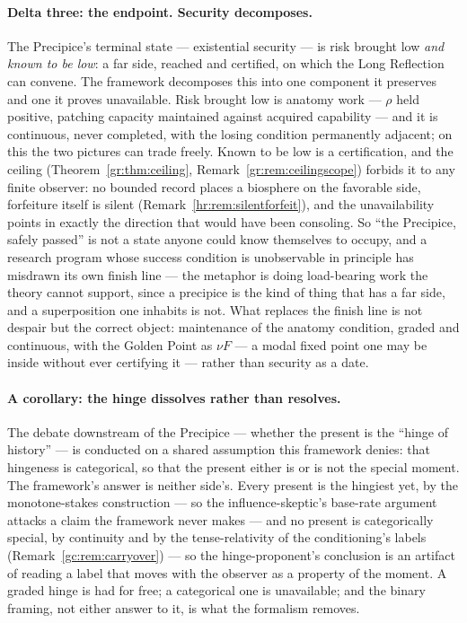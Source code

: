 \documentclass[11pt]{article}
\numberwithin{equation}{section}
\theoremstyle{plain}
\theoremstyle{definition}
\theoremstyle{remark}
\begin{document}
\paragraph{Delta three: the endpoint. Security decomposes.} The
Precipice's terminal state --- existential security --- is risk
brought low \emph{and known to be low}: a far side, reached and
certified, on which the Long Reflection can convene. The framework
decomposes this into one component it preserves and one it proves
unavailable. Risk brought low is anatomy work --- $\rho$ held
positive, patching capacity maintained against acquired capability ---
and it is continuous, never completed, with the losing condition
permanently adjacent; on this the two pictures can trade freely.
Known to be low is a certification, and the ceiling
(Theorem~\ref{gr:thm:ceiling}, Remark~\ref{gr:rem:ceilingscope})
forbids it to any finite observer: no bounded record places a
biosphere on the favorable side, forfeiture itself is silent
(Remark~\ref{hr:rem:silentforfeit}), and the unavailability points in
exactly the direction that would have been consoling. So ``the
Precipice, safely passed'' is not a state anyone could know themselves
to occupy, and a research program whose success condition is
unobservable in principle has misdrawn its own finish line --- the
metaphor is doing load-bearing work the theory cannot support, since a
precipice is the kind of thing that has a far side, and a
superposition one inhabits is not. What replaces the finish line is
not despair but the correct object: maintenance of the anatomy
condition, graded and continuous, with the Golden Point as
$\nu F$ --- a modal fixed point one may be inside without ever
certifying it --- rather than security as a date.

\paragraph{A corollary: the hinge dissolves rather than resolves.}
The debate downstream of the Precipice --- whether the present is the
``hinge of history'' \cite{MacAskill22, GM21} --- is conducted on a
shared assumption this framework denies: that hingeness is
categorical, so that the present either is or is not the special
moment. The framework's answer is neither side's. Every present is the
hingiest yet, by the monotone-stakes construction --- so the
influence-skeptic's base-rate argument attacks a claim the framework
never makes --- and no present is categorically special, by
continuity and by the tense-relativity of the conditioning's labels
(Remark~\ref{gc:rem:carryover}) --- so the hinge-proponent's
conclusion is an artifact of reading a label that moves with the
observer as a property of the moment. A graded hinge is had for free;
a categorical one is unavailable; and the binary framing, not either
answer to it, is what the formalism removes.
\end{document}
